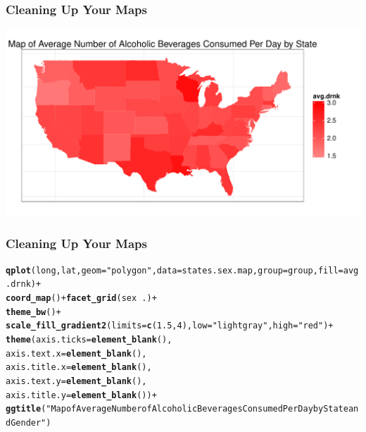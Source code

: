 \documentclass{beamer}\usepackage[]{graphicx}\usepackage[]{color}
\makeatletter
\newcommand{\hlnum}[1]{\textcolor[rgb]{0.686,0.059,0.569}{#1}}%
\newcommand{\hlstr}[1]{\textcolor[rgb]{0.192,0.494,0.8}{#1}}%
\newcommand{\hlopt}[1]{\textcolor[rgb]{0,0,0}{#1}}%
\newcommand{\hlstd}[1]{\textcolor[rgb]{0.345,0.345,0.345}{#1}}%
\newcommand{\hlkwc}[1]{\textcolor[rgb]{0.333,0.667,0.333}{#1}}%
\newcommand{\hlkwd}[1]{\textcolor[rgb]{0.737,0.353,0.396}{\textbf{#1}}}%
\newenvironment{kframe}{%
 \def\at@end@of@kframe{}%
 \ifinner\ifhmode%
  \def\at@end@of@kframe{\end{minipage}}%
  \begin{minipage}{\columnwidth}%
 \fi\fi%
 \def\FrameCommand##1{\hskip\@totalleftmargin \hskip-\fboxsep
 \colorbox{shadecolor}{##1}\hskip-\fboxsep
     \hskip-\linewidth \hskip-\@totalleftmargin \hskip\columnwidth}%
 \MakeFramed {\advance\hsize-\width
   \@totalleftmargin\z@ \linewidth\hsize
   \@setminipage}}%
 {\par\unskip\endMakeFramed%
 \at@end@of@kframe}
\newenvironment{knitrout}{}{} %
\makeatother
\begin{document}

\begin{frame}[fragile]
    \frametitle{Cleaning Up Your Maps}

\begin{knitrout}\footnotesize
{}\color{fgcolor}
\includegraphics[width=\textwidth]{figure/kalcohol3} 

\end{knitrout}

\end{frame}



\begin{frame}[fragile]
    \frametitle{Cleaning Up Your Maps}

\begin{knitrout}\footnotesize
{}\color{fgcolor}\begin{kframe}
\begin{alltt}
\hlkwd{qplot}\hlstd{(long, lat,} \hlkwc{geom}\hlstd{=}\hlstr{"polygon"}\hlstd{,} \hlkwc{data}\hlstd{=states.sex.map,} \hlkwc{group}\hlstd{=group,} \hlkwc{fill}\hlstd{=avg.drnk)} \hlopt{+}
  \hlkwd{coord_map}\hlstd{()} \hlopt{+} \hlkwd{facet_grid}\hlstd{(sex} \hlopt{~} \hlstd{.)} \hlopt{+}
  \hlkwd{theme_bw}\hlstd{()} \hlopt{+}
  \hlkwd{scale_fill_gradient2}\hlstd{(}\hlkwc{limits}\hlstd{=}\hlkwd{c}\hlstd{(}\hlnum{1.5}\hlstd{,} \hlnum{4}\hlstd{),}\hlkwc{low}\hlstd{=}\hlstr{"lightgray"}\hlstd{,}\hlkwc{high}\hlstd{=}\hlstr{"red"}\hlstd{)} \hlopt{+}
  \hlkwd{theme}\hlstd{(}\hlkwc{axis.ticks} \hlstd{=} \hlkwd{element_blank}\hlstd{(),}
       \hlkwc{axis.text.x} \hlstd{=} \hlkwd{element_blank}\hlstd{(),}
       \hlkwc{axis.title.x}\hlstd{=}\hlkwd{element_blank}\hlstd{(),}
       \hlkwc{axis.text.y} \hlstd{=} \hlkwd{element_blank}\hlstd{(),}
       \hlkwc{axis.title.y}\hlstd{=}\hlkwd{element_blank}\hlstd{())} \hlopt{+}
  \hlkwd{ggtitle}\hlstd{(}\hlstr{"Map of Average Number of Alcoholic Beverages Consumed Per Day by State and Gender"}\hlstd{)}
\end{alltt}
\end{kframe}
\end{knitrout}

\end{frame}
 
\end{document}
